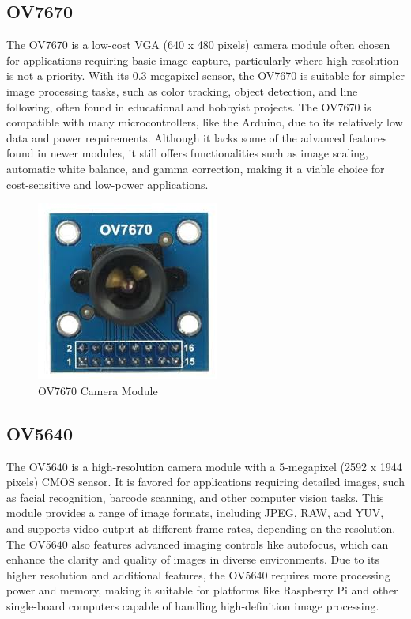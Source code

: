 \subsection{OV7670}
The OV7670 is a low-cost VGA (640 x 480 pixels) camera module often chosen for applications requiring basic image capture, particularly where high resolution is not a priority. With its 0.3-megapixel sensor, the OV7670 is suitable for simpler image processing tasks, such as color tracking, object detection, and line following, often found in educational and hobbyist projects. The OV7670 is compatible with many microcontrollers, like the Arduino, due to its relatively low data and power requirements. Although it lacks some of the advanced features found in newer modules, it still offers functionalities such as image scaling, automatic white balance, and gamma correction, making it a viable choice for cost-sensitive and low-power applications. \cite{OV7670}
\begin{figure}[h]
	\centering
	\includegraphics[width=0.5\linewidth]{assets/ch2/OV7670}
	\caption{OV7670 Camera Module}
	\label{fig:ov7670}
\end{figure}


\subsection{OV5640}
The OV5640 is a high-resolution camera module with a 5-megapixel (2592 x 1944 pixels) CMOS sensor. It is favored for applications requiring detailed images, such as facial recognition, barcode scanning, and other computer vision tasks. This module provides a range of image formats, including JPEG, RAW, and YUV, and supports video output at different frame rates, depending on the resolution. The OV5640 also features advanced imaging controls like autofocus, which can enhance the clarity and quality of images in diverse environments. Due to its higher resolution and additional features, the OV5640 requires more processing power and memory, making it suitable for platforms like Raspberry Pi and other single-board computers capable of handling high-definition image processing. \cite{OV5640}

